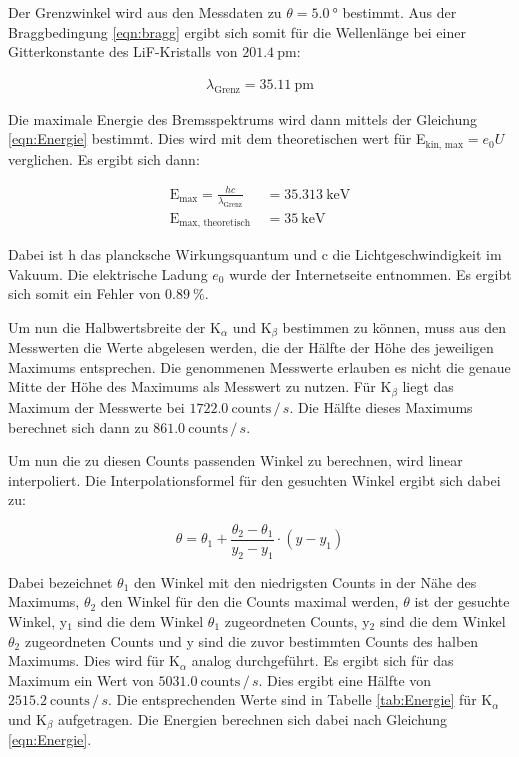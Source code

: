 Der Grenzwinkel wird aus den Messdaten zu $\theta = \SI{5.0}{\degree}$ bestimmt.
Aus der Braggbedingung \eqref{eqn:bragg} ergibt sich somit für die Wellenlänge bei einer Gitterkonstante des LiF-Kristalls von $\SI{201.4}{\pico\metre}$:

\begin{align*}
  \lambda_\text{Grenz} = \SI{35.11}{\pico\metre}
\end{align*}

Die maximale Energie des Bremsspektrums wird dann mittels der Gleichung \eqref{eqn:Energie} bestimmt.
Dies wird mit dem theoretischen wert für E$_\text{kin, max} = e_0 U$ verglichen.
Es ergibt sich dann:

\begin{align*}
  \text{E}_\text{max} = \frac{h c}{\lambda_\text{Grenz}} &= \SI{35.313}{\kilo\electronvolt} \\
  \text{E}_\text{max, theoretisch } &= \SI{35}{\kilo\electronvolt}
\end{align*}

Dabei ist h das plancksche Wirkungsquantum und c die Lichtgeschwindigkeit im Vakuum.
Die elektrische Ladung $e_0$ wurde der Internetseite \cite{e0} entnommen.
Es ergibt sich somit ein Fehler von $\SI{0.89}{\percent}$.

\FloatBarrier
Um nun die Halbwertsbreite der K$_\alpha$ und K$_\beta$ bestimmen zu können, muss aus den Messwerten die Werte abgelesen werden, die der Hälfte der Höhe des jeweiligen Maximums entsprechen.
Die genommenen Messwerte erlauben es nicht die genaue Mitte der Höhe des Maximums als Messwert zu nutzen.
Für K$_\beta$ liegt das Maximum der Messwerte bei $1722.0\ \text{counts} \, / \, s$.
Die Hälfte dieses Maximums berechnet sich dann zu  $861.0\ \text{counts} \, / \, s$.

Um nun die zu diesen Counts passenden Winkel zu berechnen, wird linear interpoliert.
Die Interpolationsformel für den gesuchten Winkel ergibt sich dabei zu:

\begin{equation}
  \theta = \theta_{1} + \frac{\theta_{2} - \theta_{1}}{y_{2} - y_{1}} \cdot \left(y - y_{1} \right)
\end{equation}

Dabei bezeichnet $\theta_{1}$ den Winkel mit den niedrigsten Counts in der Nähe des Maximums, $\theta_{2}$ den Winkel für den die Counts maximal werden, $\theta$ ist der gesuchte Winkel, y$_{1}$ sind die dem Winkel $\theta_{1}$ zugeordneten Counts, y$_{2}$ sind die dem Winkel $\theta_{2}$ zugeordneten Counts und y sind die zuvor bestimmten Counts des halben Maximums.
Dies wird für K$_\alpha$ analog durchgeführt.
Es ergibt sich für das Maximum ein Wert von $5031.0\ \text{counts} \, / \, s$.
Dies ergibt eine Hälfte von $2515.2\ \text{counts} \, / \, s$.
Die entsprechenden Werte sind in Tabelle \ref{tab:Energie} für K$_\alpha$ und K$_\beta$ aufgetragen.
Die Energien berechnen sich dabei nach Gleichung \eqref{eqn:Energie}.

